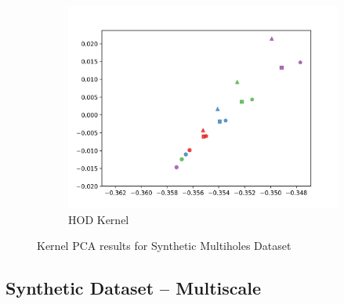 \documentclass[10pt]{article}
\begin{document}
\begin{figure}[H]
\begin{subfigure}[h]{0.33\textwidth}
        \includegraphics[width=\linewidth]{mh_hod}
        \caption{HOD Kernel}
    \end{subfigure}%
    \caption{Kernel PCA results for Synthetic Multiholes Dataset}
\end{figure}

\subsection{Synthetic Dataset -- Multiscale}
\end{document}
